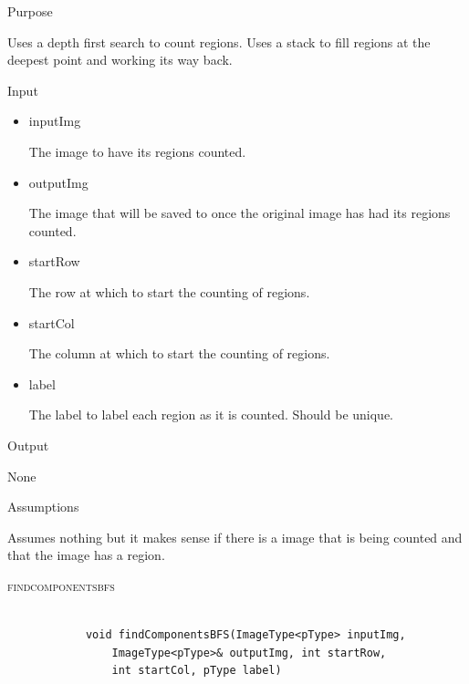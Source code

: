 \documentclass[pdftex, 11pt]{article}
\begin{document}
\begin{description}
		\begin{description}
			\item{Purpose}

				Uses a depth first search to count regions. Uses
				a stack to fill regions at the deepest point and
				working its way back.

			\item{Input}

				\begin{itemize}

					\item{inputImg}

						The image to have its regions
						counted.

					\item{outputImg}

						The image that will be saved to
						once the original image has had
						its regions counted.

					\item{startRow}

						The row at which to start the
						counting of regions.

					\item{startCol}

						The column at which to start the
						counting of regions.

					\item{label}

						The label to label each region
						as it is counted. Should be
						unique.

				\end{itemize}

			\item{Output}

				None

			\item{Assumptions}

				Assumes nothing but it makes sense if there is a
				image that is being counted and that the image
				has a region.


		\end{description}
	\item{\textsc{findcomponentsbfs}}

		\begin{lstlisting}

			void findComponentsBFS(ImageType<pType> inputImg,
				ImageType<pType>& outputImg, int startRow,
				int startCol, pType label)
		\end{lstlisting}


\end{description}
\end{document}
